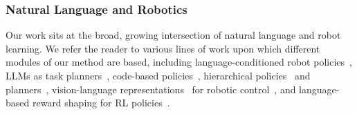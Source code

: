 \subsubsection{Natural Language and Robotics}
Our work sits at the broad, growing intersection of natural language and robot learning. We refer the reader to various lines of work upon which different modules of our method are based, including language-conditioned robot policies~\cite{jang2021bc, lynch2021language, calvin2021, hulc22, shao2020concept, sodhani2021multi, silva2021langcon, karamcheti2021lila, jiang2022vima, shah2023mutex, yu2022deltaco}, LLMs as task planners~\cite{huang2022inner, saycan2022arxiv, chen2022nlmapsaycan, raman2023cape}, code-based policies~\cite{codeaspolicies2022, pmlrv235li24ar, huang2023voxposercomposable3dvalue}, hierarchical policies~\cite{shi2025hirobotopenendedinstruction, shi2024yellrobotimprovingonthefly, belkhale2024rthactionhierarchiesusing} and planners~\cite{choi2025reactree, luo2023obtaining}, vision-language representations~\cite{radford2021learning, zhai2021lit, zhu2023languagebind} for robotic control~\cite{nair2022r3m, shridhar2021cliport, shridhar2022peract, yu2024lang4sim2real}, and language-based reward shaping for RL policies~\cite{nair2021lorel, goyal2019learn, goyal2020pixl2r, fan2022minedojo, ma2023liv, ma2024eurekahumanlevelrewarddesign, ma2024dreureka, yu2023languagerewardsroboticskill}.
